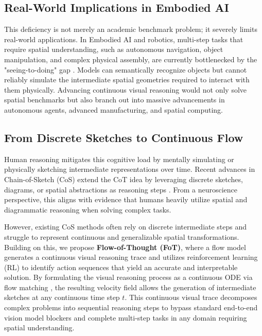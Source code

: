 \documentclass{l4proj}
\begin{document}
\subsection{Real-World Implications in Embodied AI}
This deficiency is not merely an academic benchmark problem; it severely limits real-world applications. In Embodied AI and robotics, multi-step tasks that require spatial understanding, such as autonomous navigation, object manipulation, and complex physical assembly, are currently bottlenecked by the "seeing-to-doing" gap \citep{yuan2025embodied}. Models can semantically recognize objects but cannot reliably simulate the intermediate spatial geometries required to interact with them physically. Advancing continuous visual reasoning would not only solve spatial benchmarks but also branch out into massive advancements in autonomous agents, advanced manufacturing, and spatial computing.

\subsection{From Discrete Sketches to Continuous Flow}
Human reasoning mitigates this cognitive load by mentally simulating or physically sketching intermediate representations over time. Recent advances in Chain-of-Sketch (CoS) extend the CoT idea by leveraging discrete sketches, diagrams, or spatial abstractions as reasoning steps \citep{lotfi2024cos, hu2024visual}. From a neuroscience perspective, this aligns with evidence that humans heavily utilize spatial and diagrammatic reasoning when solving complex tasks.

However, existing CoS methods often rely on discrete intermediate steps and struggle to represent continuous and generalizable spatial transformations. Building on this, we propose \textbf{Flow-of-Thought (FoT)}, where a flow model generates a continuous visual reasoning trace and utilizes reinforcement learning (RL) to identify action sequences that yield an accurate and interpretable solution. By formulating the visual reasoning process as a continuous ODE via flow matching \citep{lipman2022flow}, the resulting velocity field allows the generation of intermediate sketches at any continuous time step $t$. This continuous visual trace decomposes complex problems into sequential reasoning steps to bypass standard end-to-end vision model blockers and complete multi-step tasks in any domain requiring spatial understanding.
\end{document}
